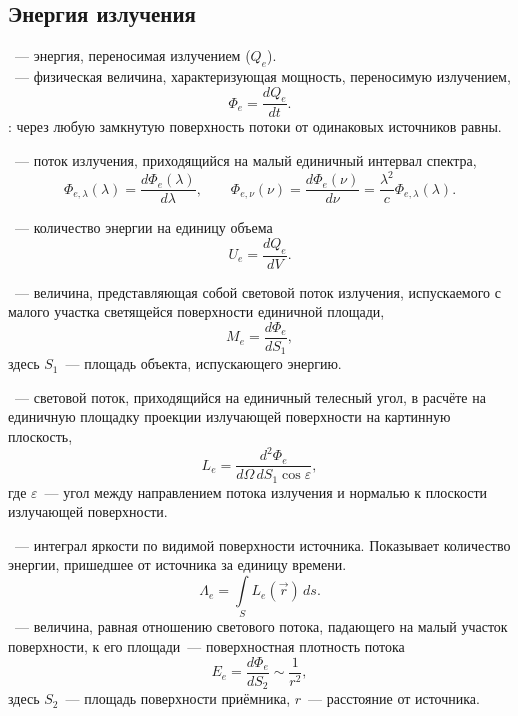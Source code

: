 \subsection{Энергия излучения}
~--- энергия, переносимая излучением ($Q_e$).\\
~--- физическая величина, характеризующая мощность, переносимую излучением,
\begin{equation}
	\Phi_e = \frac{d Q_e}{dt}.
\end{equation}
: через любую замкнутую поверхность потоки от одинаковых источников равны.

~--- поток излучения, приходящийся на малый единичный интервал спектра,
\begin{equation}
	\Phi_{e, \lambda}(\lambda) = \frac{d\Phi_e(\lambda)}{d\lambda}, \quad\quad \Phi_{e, \nu}(\nu) = \frac{d\Phi_e(\nu)}{d\nu} =  \frac{\lambda^2}{c}\Phi_{e, \lambda}(\lambda).
\end{equation}

~--- количество энергии на единицу объема
\begin{equation}
	U_e = \frac{d Q_e}{dV}.
\end{equation}

~--- величина, представляющая собой световой поток излучения, испускаемого с малого участка светящейся поверхности единичной площади,
\begin{equation}
	M_e = \frac{d \Phi_e}{dS_1},
\end{equation}
здесь $S_1$~--- площадь объекта, испускающего энергию.

~--- световой поток, приходящийся на единичный телесный угол, в расчёте на единичную площадку проекции излучающей поверхности на картинную плоскость,
\begin{equation}
	L_e = \frac{d^2 \Phi_e}{d \Omega\,dS_1 \cos \varepsilon},
\end{equation}
где $\varepsilon$~--- угол между направлением потока излучения и нормалью к плоскости излучающей поверхности.

~--- интеграл яркости по видимой поверхности источника. Показывает количество энергии, пришедшее от источника за единицу времени.
\begin{equation}
	\Lambda_e = \int \limits_S L_e(\vec{r})\,ds.
\end{equation}
~--- величина, равная отношению светового потока, падающего на малый участок поверхности, к его площади~--- поверхностная плотность потока
\begin{equation}
	E_e = \frac{d\Phi_e}{dS_2} \sim \frac{1}{r^2},
\end{equation}
здесь $S_2$~--- площадь поверхности приёмника, $r$~--- расстояние от источника.
